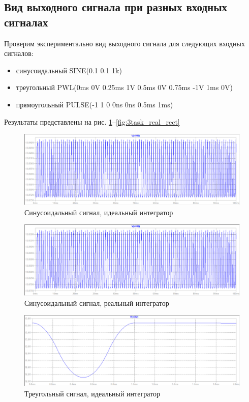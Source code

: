 \documentclass[a4paper, 12pt]{article}
\begin{document}
    \subsection{Вид выходного сигнала при разных входных сигналах}
    Проверим экспериментально вид выходного сигнала для следующих
    входных сигналов: 
    \begin{itemize}
        \item синусоидальный SINE(0.1 0.1 1k)
        \item треугольный PWL(0ms 0V 0.25ms 1V 0.5ms 0V 0.75ms -1V 1ms 0V)
        \item прямоугольный PULSE(-1 1 0 0ns 0ns 0.5ms 1ms)
    \end{itemize}
    Результаты представлены на рис. \ref{fig:3task_ideal_sine}--\ref{fig:3task_real_rect}
    \begin{figure}[H]
        \centering
        \includegraphics[scale=0.46]{3task_ideal_sine.png}
        \captionsetup{skip=0pt}
        \caption{Синусоидальный сигнал, идеальный интегратор}
        \label{fig:3task_ideal_sine}
    \end{figure}
    \begin{figure}[H]
        \centering
        \includegraphics[scale=0.46]{3task_real_sine.png}
        \captionsetup{skip=0pt}
        \caption{Синусоидальный сигнал, реальный интегратор}
        \label{fig:3task_real_sine}
    \end{figure}
    \begin{figure}[H]
        \centering
        \includegraphics[scale=0.46]{3task_ideal_triangle.png}
        \captionsetup{skip=0pt}
        \caption{Треугольный сигнал, идеальный интегратор}
        \label{fig:3task_ideal_triangle}
    \end{figure}
\end{document}
